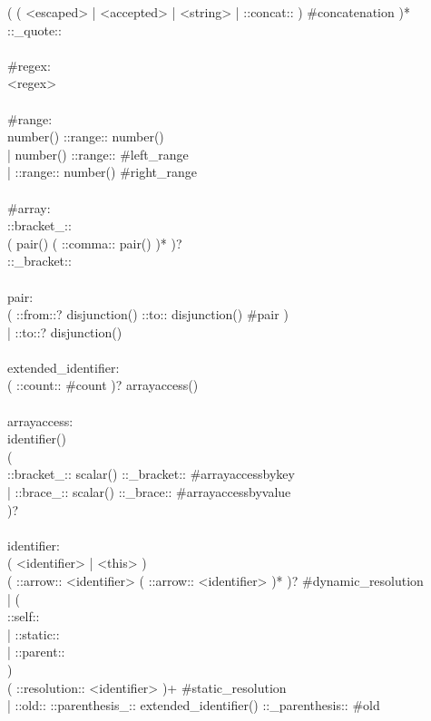 \begin{bigbigpre}
    ( ( <escaped> | <accepted> | <string> | ::concat:: ) #concatenation )* \\
    ::_quote:: \\
 \\
#regex: \\
    <regex> \\
 \\
#range: \\
    number() ::range:: number() \\
  | number() ::range:: #left_range \\
  | ::range:: number() #right_range \\
 \\
#array: \\
    ::bracket_:: \\
    ( pair() ( ::comma:: pair() )* )? \\
    ::_bracket:: \\
 \\
pair: \\
    ( ::from::? disjunction() ::to:: disjunction() #pair ) \\
  | ::to::? disjunction() \\
 \\
extended_identifier: \\
    ( ::count:: #count )? arrayaccess() \\
 \\
arrayaccess: \\
    identifier() \\
    ( \\
        ::bracket_:: scalar() ::_bracket:: #arrayaccessbykey \\
      | ::brace_::   scalar() ::_brace::   #arrayaccessbyvalue \\
    )? \\
 \\
identifier: \\
    ( <identifier> | <this> ) \\
    ( ::arrow:: <identifier> ( ::arrow:: <identifier> )* )? #dynamic_resolution \\
  | ( \\
        ::self:: \\
      | ::static:: \\
      | ::parent:: \\
    ) \\
    ( ::resolution:: <identifier> )+ #static_resolution \\
  | ::old:: ::parenthesis_:: extended_identifier() ::_parenthesis:: #old \\

\end{bigbigpre}
